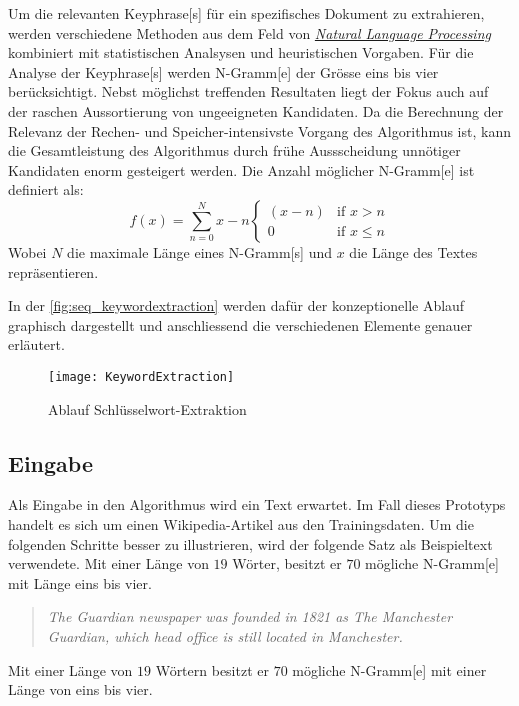 Um die relevanten \gls{Keyphrase}[s] für ein spezifisches Dokument zu extrahieren, werden verschiedene Methoden aus dem Feld von \hyperref[natural-language-processing]{\textit{Natural Language Processing}} kombiniert mit statistischen Analsysen und heuristischen Vorgaben. Für die Analyse der \gls{Keyphrase}[s] werden \gls{N-Gramm}[e] der Grösse eins bis vier berücksichtigt. Nebst möglichst treffenden Resultaten liegt der Fokus auch auf der raschen Aussortierung von ungeeigneten Kandidaten. Da die Berechnung der Relevanz der Rechen- und Speicher-intensivste Vorgang des Algorithmus ist, kann die Gesamtleistung des Algorithmus durch frühe Aussscheidung unnötiger Kandidaten enorm gesteigert werden. Die Anzahl möglicher \gls{N-Gramm}[e] ist definiert als: 
\[f(x)=\sum_{n=0}^N x - n  
\begin{cases} 
   (x - n)  & \text{if } x > n \\
   0      & \text{if } x \leq n
  \end{cases}\]
Wobei $N$ die maximale Länge eines \gls{N-Gramm}[s] und $x$ die Länge des Textes repräsentieren.

In der \autoref{fig:seq_keywordextraction} werden dafür der konzeptionelle Ablauf graphisch dargestellt und anschliessend die verschiedenen Elemente genauer erläutert.

    \begin{figure}[H]
    \centering
    \texttt{[image: KeywordExtraction]}
    \caption{Ablauf Schlüsselwort-Extraktion}
    \label{fig:seq_keywordextraction}
    \end{figure}
 
 
 

\subsection{Eingabe}


Als Eingabe in den Algorithmus wird ein Text erwartet. Im Fall dieses Prototyps handelt es sich um einen Wikipedia-Artikel aus den Trainingsdaten. Um die folgenden Schritte besser zu illustrieren, wird der folgende Satz als Beispieltext verwendete. Mit einer Länge von $19$ Wörter, besitzt er $70$ mögliche \gls{N-Gramm}[e] mit Länge eins bis vier.

\begin{quote}
\textit{The Guardian newspaper was founded in 1821 as \glqq The Manchester Guardian\grqq, which head office is still located in Manchester.}
\end{quote}
Mit einer Länge von $19$ Wörtern besitzt er $70$ mögliche \gls{N-Gramm}[e] mit einer Länge von eins bis vier.

